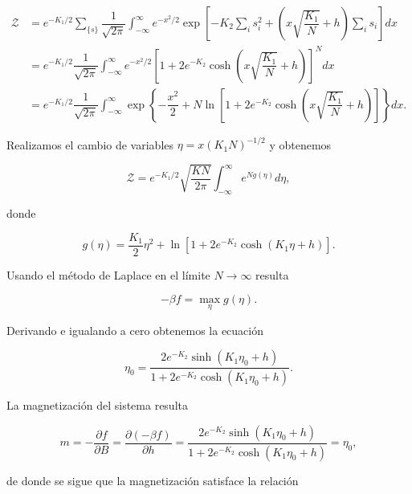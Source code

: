 \documentclass[10pt]{article}
\begin{document}
\begin{align}
\mathcal{Z} &= e^{-K_1/2} \sum_{\lbrace s \rbrace} \dfrac{1}{\sqrt{2\pi}}  \int_{-\infty}^{\infty} e^{-x^2/2} \exp \left[ - K_2 \sum_i s_i^2 + \left(x\sqrt{\dfrac{K_1}{N}} + h\right) \sum_i s_i \right] dx \nonumber \\
&= e^{-K_1/2} \dfrac{1}{\sqrt{2\pi}} \int_{-\infty}^{\infty} e^{-x^2/2} \left[1+  2 e^{-K_2}\cosh\left( x\sqrt{\dfrac{K_1}{N}} + h \right)\right]^N dx \nonumber \\
&= e^{-K_1/2} \dfrac{1}{\sqrt{2\pi}} \int_{-\infty}^{\infty} \exp\left\lbrace -\dfrac{x^2}{2} + N \ln\left[1+  2 e^{-K_2}\cosh\left( x\sqrt{\dfrac{K_1}{N}} + h \right)\right] \right\rbrace dx.
\end{align}

Realizamos el cambio de variables $\eta = x(K_1 N)^{-1/2}$ y obtenemos

\begin{equation}
\mathcal{Z} = e^{-K_1/2} \sqrt{\dfrac{KN}{2\pi}} \int_{-\infty}^{\infty} e^{Ng(\eta)} d\eta,
\end{equation}

donde

\begin{equation}
g(\eta) = \dfrac{K_1}{2}\eta^2 + \ln \left[1+ 2e^{-K_2}\cosh\left( K_1\eta + h \right) \right].
\end{equation}

Usando el m\'etodo de Laplace en el l\'imite $N\rightarrow\infty$ resulta

\begin{equation}
-\beta f = \max_{\eta} g(\eta).
\end{equation}

Derivando e igualando a cero obtenemos la ecuaci\'on

\begin{equation}
 \eta_0 = \dfrac{2e^{-K_2}\sinh\left( K_1\eta_0 + h \right)}{1+2e^{-K_2}\cosh\left( K_1\eta_0 + h \right)}.
\end{equation}

La magnetizaci\'on del sistema resulta

\begin{equation}
m = -\dfrac{\partial f}{\partial B} = \dfrac{\partial (-\beta f)}{\partial h} = \dfrac{2e^{-K_2}\sinh\left( K_1\eta_0 + h \right)}{1+2e^{-K_2}\cosh\left( K_1\eta_0 + h \right)} = \eta_0,
\end{equation}

de donde se sigue que la magnetizaci\'on satisface la relaci\'on
\end{document}
